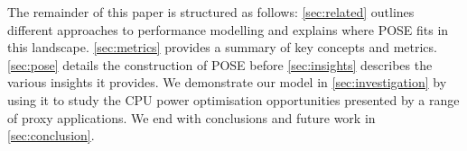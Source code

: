 The remainder of this paper is structured as follows: \autoref{sec:related} outlines different approaches to performance modelling and explains where POSE fits in this landscape.
\autoref{sec:metrics} provides a summary of key concepts and metrics.
\autoref{sec:pose} details the construction of POSE before \autoref{sec:insights} describes the various insights it provides.
We demonstrate our model in \autoref{sec:investigation} by using it to study the CPU power optimisation opportunities presented by a range of proxy applications. 
We end with conclusions and future work in \autoref{sec:conclusion}.
